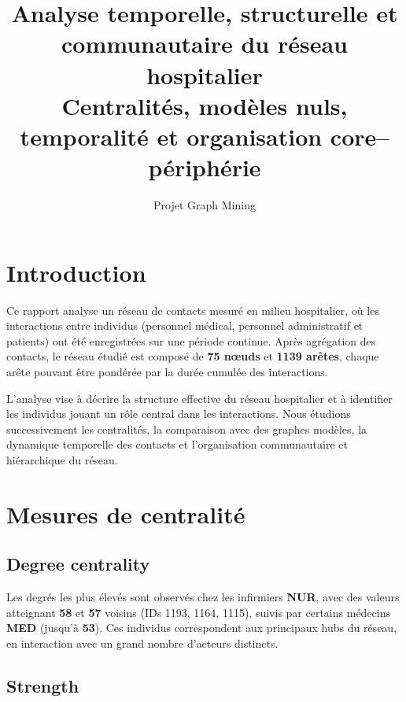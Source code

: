 \documentclass[10pt,twocolumn]{article}
\title{\textbf{Analyse temporelle, structurelle et communautaire du réseau hospitalier} \\
\large Centralités, modèles nuls, temporalité et organisation core--périphérie}
\author{Projet Graph Mining}
\date{}
\begin{document}
\maketitle

\section{Introduction}

Ce rapport analyse un réseau de contacts mesuré en milieu hospitalier,
où les interactions entre individus (personnel médical, personnel administratif
et patients) ont été enregistrées sur une période continue.
Après agrégation des contacts, le réseau étudié est composé de
\textbf{75 nœuds} et \textbf{1139 arêtes}, chaque arête pouvant être pondérée
par la durée cumulée des interactions.

L’analyse vise à décrire la structure effective du réseau hospitalier
et à identifier les individus jouant un rôle central dans les interactions.
Nous étudions successivement les centralités, la comparaison avec des graphes modèles,
la dynamique temporelle des contacts et l’organisation communautaire et hiérarchique
du réseau.




\section{Mesures de centralité}

\subsection{Degree centrality}

Les degrés les plus élevés sont observés chez les infirmiers \textbf{NUR},
avec des valeurs atteignant \textbf{58} et \textbf{57} voisins (IDs 1193, 1164, 1115),
suivis par certains médecins \textbf{MED} (jusqu’à \textbf{53}).
Ces individus correspondent aux principaux hubs du réseau,
en interaction avec un grand nombre d’acteurs distincts.

\subsection{Strength}
\end{document}
